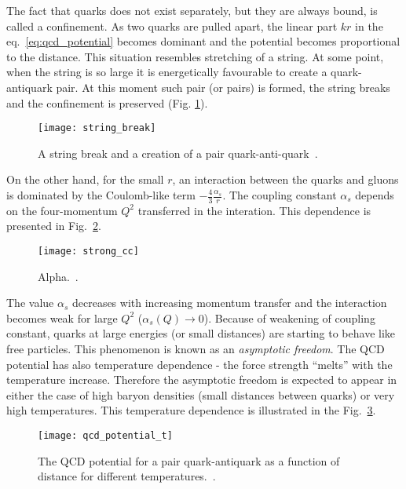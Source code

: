       The fact that quarks does not exist separately, but they are always bound, is called a confinement.
      As two quarks are pulled apart, the linear part $kr$ in the eq.~\ref{eq:qcd_potential} becomes dominant and the potential becomes proportional to the distance.
      This situation resembles stretching of a string.
      At some point, when the string is so large it is energetically favourable to create a quark-antiquark pair.
      At this moment such pair (or pairs) is formed, the string breaks and the confinement is preserved (Fig. \ref{fig:string_break}).
      \begin{figure}[h]
        \centering
        \texttt{[image: string\_break]}
        \caption{A string break and a creation of a pair quark-anti-quark~\cite{dfck}.}
        \label{fig:string_break}
      \end{figure}
      
      On the other hand, for the small $r$, an interaction between the quarks and gluons is dominated by the Coulomb-like term $-\frac{4}{3} \frac{\alpha_s}{r}$.
      The coupling constant $\alpha_s$ depends on the four-momentum $Q^2$ transferred in the interation.
      This dependence is presented in Fig.~\ref{fig:strong_cc}.
      \begin{figure}[h]
        \centering
        \texttt{[image: strong\_cc]}
        \caption{Alpha.~\cite{pdg}.}
        \label{fig:strong_cc}
      \end{figure}
      The value $\alpha_s$ decreases with increasing momentum transfer and the interaction becomes weak for large $Q^2$ ($\alpha_s (Q) \to 0$).
      Because of weakening of coupling constant, quarks at large energies (or small distances) are starting to behave like free particles.
      This phenomenon is known as an \textit{asymptotic freedom}.      
      The QCD potential has also temperature dependence - the force strength ``melts'' with the temperature increase.
      Therefore the asymptotic freedom is expected to appear in either the case of high baryon densities (small distances between quarks) or very high temperatures.
      This temperature dependence is illustrated in the Fig.~\ref{fig:qcd_potential}.
      \begin{figure}[h]
        \centering
        \texttt{[image: qcd\_potential\_t]}
        \caption{The QCD potential for a pair quark-antiquark as a function of distance for different temperatures.~\cite{dfck}.}
        \label{fig:qcd_potential}
      \end{figure}
      
